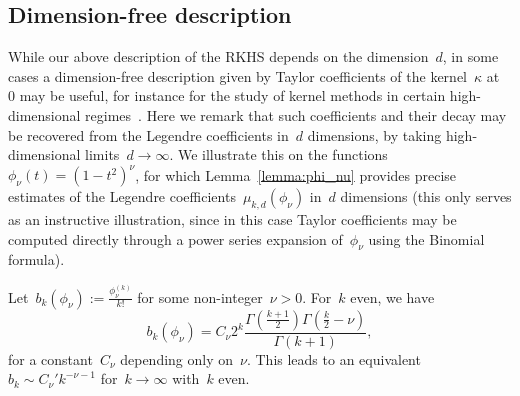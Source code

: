 \subsection{Dimension-free description}
\label{sub:appx_dimension_free}
While our above description of the RKHS depends on the dimension~$d$, in some cases a dimension-free description given by Taylor coefficients of the kernel~$\kappa$ at~$0$ may be useful,
for instance for the study of kernel methods in certain high-dimensional regimes~\citep[\eg,][]{el2010spectrum,ghorbani2019linearized,liang2019risk}.
Here we remark that such coefficients and their decay may be recovered from the Legendre coefficients in~$d$ dimensions, by taking high-dimensional limits~$d \to \infty$.
We illustrate this on the functions~$\phi_\nu(t) = (1 - t^2)^\nu$, for which Lemma~\ref{lemma:phi_nu} provides precise estimates of the Legendre coefficients~$\mu_{k,d}(\phi_\nu)$ in~$d$ dimensions (this only serves as an instructive illustration, since in this case Taylor coefficients may be computed directly through a power series expansion of~$\phi_\nu$ using the Binomial formula).
\begin{lemma}
\label{lemma:bk_phinu}
Let~$b_k(\phi_\nu) := \frac{\phi_\nu^{(k)}}{k!}$ for some non-integer~$\nu > 0$. For~$k$ even, we have
\begin{equation*}
b_k(\phi_\nu) = C_\nu 2^k \frac{\Gamma(\frac{k + 1}{2}) \Gamma(\frac{k}{2} - \nu) }{\Gamma(k+1)},
\end{equation*}
for a constant~$C_\nu$ depending only on~$\nu$. This leads to an equivalent~$b_k \sim C_\nu' k^{- \nu - 1}$ for~$k \to \infty$ with~$k$ even.
\end{lemma}
